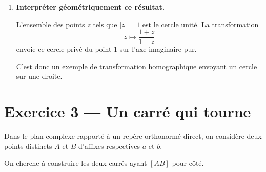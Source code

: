 \documentclass[11pt,a4paper]{article}
\newcommand{\R}{\mathbb{R}}
\newcommand{\ii}{\mathrm{i}}
\begin{document}
\begin{enumerate}[label=\textbf{\arabic*.}]
    On a donc bien
    \[
    \boxed{|z|=1\Longleftrightarrow \frac{1+z}{1-z}\in\ii\R.}
    \]

    \item \textbf{Interpréter géométriquement ce résultat.}

    L’ensemble des points \(z\) tels que \(|z|=1\) est le cercle unité. La transformation
    \[
    z\longmapsto \frac{1+z}{1-z}
    \]
    envoie ce cercle privé du point \(1\) sur l’axe imaginaire pur.

    C’est donc un exemple de transformation homographique envoyant un cercle sur une droite.

\end{enumerate}

\newpage

\section*{Exercice 3 --- Un carré qui tourne}

Dans le plan complexe rapporté à un repère orthonormé direct, on considère deux points distincts \(A\) et \(B\) d’affixes respectives \(a\) et \(b\).

On cherche à construire les deux carrés ayant \([AB]\) pour côté.
\end{document}
